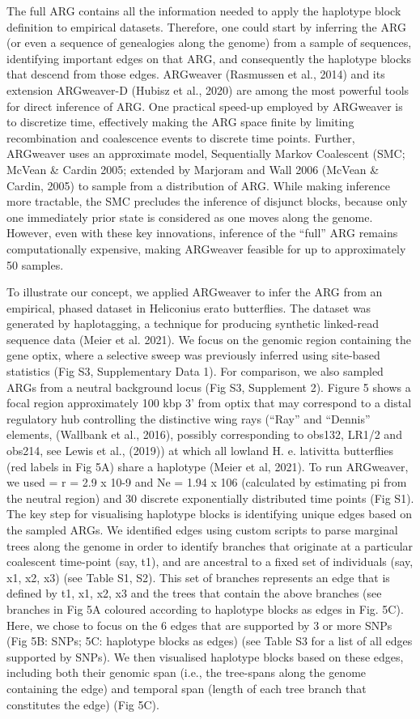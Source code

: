 \documentclass[twocolumn]{bmcart}%
\begin{document}
The full ARG contains all the information needed to apply the haplotype block definition to empirical datasets. Therefore, one could start by inferring the ARG (or even a sequence of genealogies along the genome) from a sample of sequences, identifying important edges on that ARG, and consequently the haplotype blocks that descend from those edges. ARGweaver (Rasmussen et al., 2014) and its extension ARGweaver-D (Hubisz et al., 2020) are among the most powerful tools for direct inference of ARG. One practical speed-up employed by ARGweaver is to discretize time, effectively making the ARG space finite by limiting recombination and coalescence events to discrete time points. Further, ARGweaver uses an approximate model, Sequentially Markov Coalescent (SMC; McVean \& Cardin 2005; extended by Marjoram and Wall 2006 (McVean \& Cardin, 2005) to sample from a distribution of ARG. While making inference more tractable, the SMC precludes the inference of disjunct blocks, because only one immediately prior state is considered as one moves along the genome. However, even with these key innovations, inference of the “full” ARG remains computationally expensive, making ARGweaver feasible for up to approximately 50 samples.

To illustrate our concept, we applied ARGweaver to infer the ARG from an empirical, phased dataset in Heliconius erato butterflies. The dataset was generated by haplotagging, a technique for producing synthetic linked-read sequence data (Meier et al. 2021). We focus on the genomic region containing the gene optix, where a selective sweep was previously inferred using site-based statistics (Fig S3, Supplementary Data 1). For comparison, we also sampled ARGs from a neutral background locus (Fig S3, Supplement 2). Figure 5 shows a focal region approximately 100 kbp 3’ from optix that may correspond to a distal regulatory hub controlling the distinctive wing rays (“Ray” and “Dennis” elements, (Wallbank et al., 2016), possibly corresponding to obs132, LR1/2 and obs214, see Lewis et al., (2019)) at which all lowland H. e. lativitta butterflies (red labels in Fig 5A) share a haplotype (Meier et al, 2021). To run ARGweaver, we used = r = 2.9 x 10-9 and Ne = 1.94 x 106 (calculated by estimating pi from the neutral region) and 30 discrete exponentially distributed time points (Fig S1). The key step for visualising haplotype blocks is identifying unique edges based on the sampled ARGs. We identified edges using custom scripts to parse marginal trees along the genome in order to identify branches that originate at a particular coalescent time-point (say, t1), and are ancestral to a fixed set of individuals (say, x1, x2, x3) (see Table S1, S2). This set of branches represents an edge that is defined by {t1}, {x1, x2, x3} and the trees that contain the above branches (see branches in Fig 5A coloured according to haplotype blocks as edges in Fig. 5C). Here, we chose to focus on the 6 edges that are supported by 3 or more SNPs (Fig 5B: SNPs; 5C: haplotype blocks as edges) (see Table S3 for a list of all edges supported by SNPs). We then visualised haplotype blocks based on these edges, including both their genomic span (i.e., the tree-spans along the genome containing the edge) and temporal span (length of each tree branch that constitutes the edge) (Fig 5C). 
\end{document}
